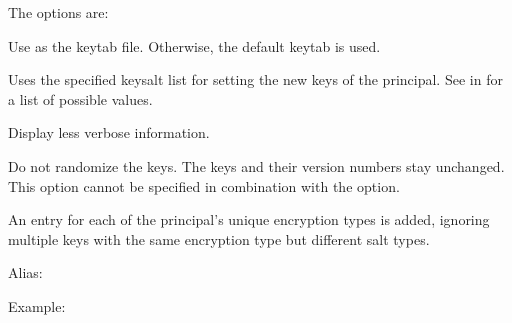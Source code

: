 \documentclass[letterpaper,10pt,english]{sphinxmanual}
\begin{document}
\sphinxAtStartPar
The options are:
\begin{description}
\sphinxAtStartPar
Use  as the keytab file.  Otherwise, the default keytab is
used.

\sphinxAtStartPar
Uses the specified keysalt list for setting the new keys of the
principal.  See {\hyperref[\detokenize{admin/conf_files/kdc_conf:keysalt-lists}]{}} in {\hyperref[\detokenize{admin/conf_files/kdc_conf:kdc-conf-5}]{}} for a
list of possible values.

\sphinxAtStartPar
Display less verbose information.

\sphinxAtStartPar
Do not randomize the keys. The keys and their version numbers stay
unchanged.  This option cannot be specified in combination with the
 option.

\end{description}

\sphinxAtStartPar
An entry for each of the principal’s unique encryption types is added,
ignoring multiple keys with the same encryption type but different
salt types.

\sphinxAtStartPar
Alias: 

\sphinxAtStartPar
Example:

\begin{sphinxVerbatim}[commandchars=\\\{\}]
    
      
          
\end{sphinxVerbatim}
\end{document}
